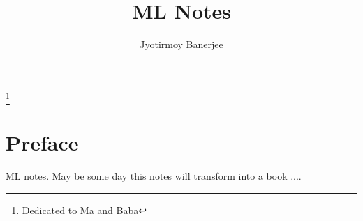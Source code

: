\documentclass{book}
\begin{document}
\pagestyle{empty}
\title{\textbf{ML Notes}}
\author{Jyotirmoy Banerjee}



\maketitle


\thispagestyle{empty}
\thanks{Dedicated to Ma and Baba}
\newpage




\pagestyle{fancy}
\fancyhf{}
\lhead[]{\thepage}
\rhead[\thepage]{}


\doublespacing



\chapter*{Preface}

ML notes. May be some day this notes will transform into a book ....



\newpage
\thispagestyle{empty}

\end{document}
